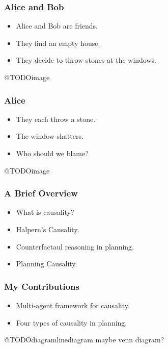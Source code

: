 \documentclass{beamer}
\theoremstyle{plain}
\theoremstyle{definition}
\begin{document}
\begin{frame}
\frametitle{Alice and Bob}
\begin{itemize}
\item Alice and Bob are friends.
\item They find an empty house.
\item They decide to throw stones at the windows.
\end{itemize}

@TODOimage

\end{frame}



\begin{frame}
\frametitle{Alice}
\begin{itemize}
\item They each throw a stone.
\item The window shatters.
\item Who should we blame?
\end{itemize}

@TODOimage

\end{frame}


\begin{frame}
\frametitle{A Brief Overview}
\begin{itemize}
\item What is causality?
\item Halpern's Causality.
\item Counterfactaul reasoning in planning.
\item Planning Causality.
\end{itemize}

\end{frame}





\begin{frame}
\frametitle{My Contributions}
\begin{itemize}
\item Multi-agent framework for causality.
\item Four types of causality in planning.
\end{itemize}

@TODOdiagramlinediagram maybe venn diagram?
\end{frame}
\end{document}
